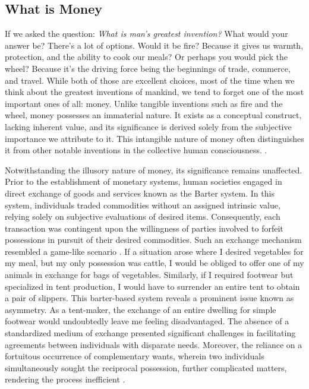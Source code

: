 \subsection{What is Money}
If we asked the question: \textit{What is man's greatest invention?} What would your answer be? There's a lot of options. Would it be fire?
Because it gives
us warmth, protection, and the ability to cook our meals? Or perhaps you would pick the wheel? Because it's the driving force being the
beginnings of trade, commerce, and travel. While both of those are excellent choices, most of the time when we think about the greatest
inventions of mankind, we tend to forget
one of the most important ones of all: money. Unlike tangible inventions such as fire and the wheel, money possesses an immaterial nature. It
exists as a conceptual construct, lacking inherent value, and its significance is derived solely from the subjective importance we attribute
to it. This intangible nature of money often distinguishes it from other notable inventions in the collective human consciousness.
\cite{smith2010wealth}.

Notwithstanding the illusory nature of money, its significance remains unaffected. Prior to the establishment of monetary systems, human
societies engaged in direct exchange of goods and services known as the Barter system. In this system, individuals traded commodities without
an assigned intrinsic value, relying solely on subjective evaluations of desired items. Consequently, each transaction was contingent upon
the willingness of parties involved to forfeit possessions in pursuit of their desired commodities. Such an exchange mechanism resembled a
game-like scenario \cite{durlauf2016new}. If a situation arose where I desired vegetables for my meal, but my only possession was cattle,
I would be obliged to offer one of my animals in exchange for bags of vegetables. Similarly, if I required footwear but specialized in tent
production, I would have to surrender an entire tent to obtain a pair of slippers. This barter-based system reveals a prominent issue known
as asymmetry. As a tent-maker, the exchange of an entire dwelling for simple footwear would undoubtedly leave me feeling disadvantaged. The
absence of a standardized medium of exchange presented significant challenges in facilitating agreements between individuals with disparate
needs. Moreover, the reliance on a fortuitous occurrence of complementary wants, wherein two individuals simultaneously sought the reciprocal
possession, further complicated matters, rendering the process inefficient \cite{goodhart1998two}.

